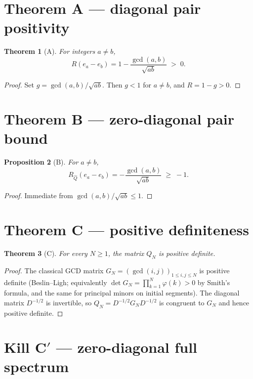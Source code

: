 \documentclass[11pt]{article}
\newtheorem{theorem}{Theorem}[section]
\newtheorem{proposition}[theorem]{Proposition}
\begin{document}
\section{Theorem A --- diagonal pair positivity}

\begin{theorem}[A]\label{thm:A}
For integers $a\neq b$,
\[
R(e_a-e_b)=1-\frac{\gcd(a,b)}{\sqrt{ab}}\;>\;0.
\]
\end{theorem}

\begin{proof}
Set $g=\gcd(a,b)/\sqrt{ab}$. Then $g<1$ for $a\neq b$, and
$R=1-g>0$.
\end{proof}

\section{Theorem B --- zero-diagonal pair bound}

\begin{proposition}[B]\label{prop:B}
For $a\neq b$,
\[
R_{\widehat Q}(e_a-e_b)
=-\frac{\gcd(a,b)}{\sqrt{ab}}
\;\ge\;-1.
\]
\end{proposition}

\begin{proof}
Immediate from $\gcd(a,b)/\sqrt{ab}\le 1$.
\end{proof}

\section{Theorem C --- positive definiteness}

\begin{theorem}[C]\label{thm:C}
For every $N\ge 1$, the matrix $Q_N$ is positive definite.
\end{theorem}

\begin{proof}
The classical GCD matrix $G_N=(\gcd(i,j))_{1\le i,j\le N}$ is positive
definite (Beslin--Ligh; equivalently $\det G_N=\prod_{k=1}^N\varphi(k)>0$
by Smith's formula, and the same for principal minors on initial segments).
The diagonal matrix $D^{-1/2}$ is invertible, so
$Q_N=D^{-1/2}G_N D^{-1/2}$ is congruent to $G_N$ and hence positive definite.
\end{proof}

\section{Kill C$'$ --- zero-diagonal full spectrum}
\end{document}
